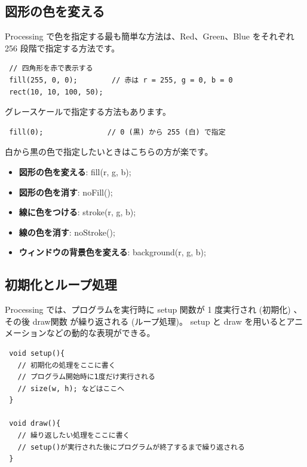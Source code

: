 \documentclass[11pt,a4paper]{jarticle}
\begin{document}
\subsection*{図形の色を変える}
Processing で色を指定する最も簡単な方法は、Red、Green、Blue をそれぞれ 256 段階で指定する方法です。
\begin{lstlisting}
 // 四角形を赤で表示する
 fill(255, 0, 0);        // 赤は r = 255, g = 0, b = 0
 rect(10, 10, 100, 50);
\end{lstlisting}
グレースケールで指定する方法もあります。
\begin{lstlisting}
 fill(0);               // 0 (黒) から 255 (白) で指定
\end{lstlisting}
白から黒の色で指定したいときはこちらの方が楽です。

\begin{itemize}
 \item \textbf{図形の色を変える}: fill(r, g, b);
 \item \textbf{図形の色を消す}: noFill();
 \item \textbf{線に色をつける}: stroke(r, g, b);
 \item \textbf{線の色を消す}: noStroke();
 \item \textbf{ウィンドウの背景色を変える}: background(r, g, b);
\end{itemize}


\subsection*{初期化とループ処理}
Processing では、プログラムを実行時に setup 関数が 1 度実行され (初期化) 、その後 draw関数 が繰り返される (ループ処理)。
setup と draw を用いるとアニメーションなどの動的な表現ができる。

\begin{lstlisting}
 void setup(){
   // 初期化の処理をここに書く
   // プログラム開始時に1度だけ実行される
   // size(w, h); などはここへ
 }

 void draw(){
   // 繰り返したい処理をここに書く
   // setup()が実行された後にプログラムが終了するまで繰り返される
 }
\end{lstlisting}
\end{document}
